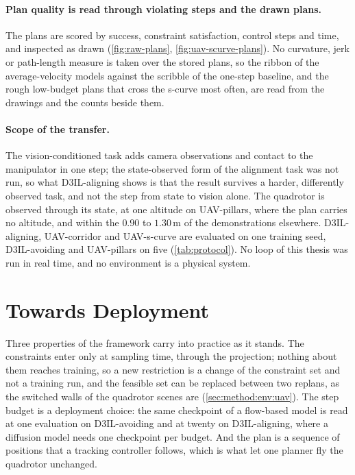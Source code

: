 \paragraph{Plan quality is read through violating steps and the drawn plans.} The plans are scored by
success, constraint satisfaction, control steps and time, and inspected as drawn (\autoref{fig:raw-plans},
\autoref{fig:uav-scurve-plans}). No curvature, jerk or path-length measure is taken over the stored
plans, so the ribbon of the average-velocity models against the scribble of the one-step baseline, and
the rough low-budget plans that cross the s-curve most often, are read from the drawings and the counts
beside them.

\paragraph{Scope of the transfer.} The vision-conditioned task adds camera observations and contact to
the manipulator in one step; the state-observed form of the alignment task was not run, so what
D3IL-aligning shows is that the result survives a harder, differently observed task, and not the step
from state to vision alone. The quadrotor is observed through its state, at one altitude on UAV-pillars,
where the plan carries no altitude, and within the $0.90$ to $1.30$\,m of the demonstrations elsewhere.
D3IL-aligning, UAV-corridor and UAV-s-curve are evaluated on one training seed, D3IL-avoiding and
UAV-pillars on five (\autoref{tab:protocol}). No loop of this thesis was run in real time, and no environment is a physical system.

\section{Towards Deployment}\label{sec:disc:practice}

Three properties of the framework carry into practice as it stands. The constraints enter only at
sampling time, through the projection; nothing about them reaches training, so a new restriction is a
change of the constraint set and not a training run, and the feasible set can be replaced between two
replans, as the switched walls of the quadrotor scenes are (\autoref{sec:method:env:uav}). The step
budget is a deployment choice: the same checkpoint of a flow-based model is read at one evaluation on
D3IL-avoiding and at twenty on D3IL-aligning, where a diffusion model needs one checkpoint per budget.
And the plan is a sequence of positions that a tracking controller follows, which is what let one
planner fly the quadrotor unchanged.

